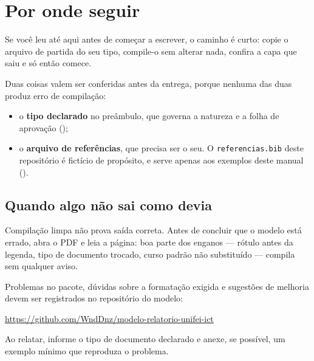 \chapter{Por onde seguir}\label{cap:conclusao}

Se você leu até aqui antes de começar a escrever, o caminho é curto: copie o arquivo de partida do
seu tipo, compile-o sem alterar nada, confira a capa que saiu e só então comece.

Duas coisas valem ser conferidas antes da entrega, porque nenhuma das duas produz erro de
compilação:

\begin{itemize}
    \item o \textbf{tipo declarado} no preâmbulo, que governa a natureza e a folha de aprovação
          ();
    \item o \textbf{arquivo de referências}, que precisa ser o seu. O \texttt{referencias.bib} deste
          repositório é fictício de propósito, e serve apenas aos exemplos deste manual
          ().
\end{itemize}

\section{Quando algo não sai como devia}\label{sec:problemas}

Compilação limpa não prova saída correta. Antes de concluir que o modelo está errado, abra o PDF e
leia a página: boa parte dos enganos --- rótulo antes da legenda, tipo de documento trocado, curso
padrão não substituído --- compila sem qualquer aviso.

Problemas no pacote, dúvidas sobre a formatação exigida e sugestões de melhoria devem ser
registrados no repositório do modelo:

\begin{center}
    \url{https://github.com/WndDnz/modelo-relatorio-unifei-ict}
\end{center}

\noindent Ao relatar, informe o tipo de documento declarado e anexe, se possível, um exemplo mínimo
que reproduza o problema.
